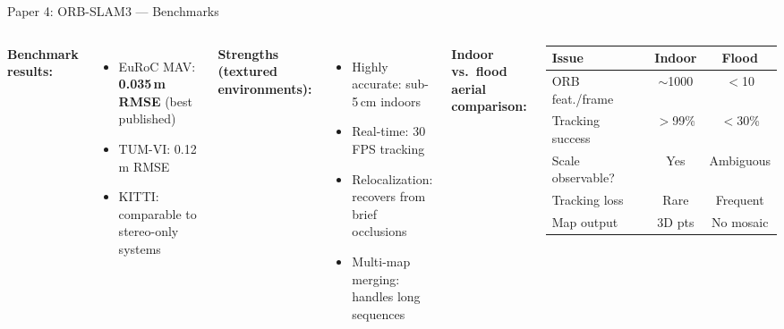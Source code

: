 \documentclass[aspectratio=169, 11pt]{beamer}
\begin{document}
\begin{frame}{Paper 4: ORB-SLAM3 --- Benchmarks}
\small
\begin{columns}[T]
\textbf{Benchmark results:}
\begin{itemize}
    \item EuRoC MAV: \textbf{0.035\,m RMSE} (best published)
    \item TUM-VI: 0.12\,m RMSE
    \item KITTI: comparable to stereo-only systems
\end{itemize}

\vspace{0.3em}
\textbf{Strengths (textured environments):}
\begin{itemize}
    \item Highly accurate: sub-5\,cm indoors
    \item Real-time: 30 FPS tracking
    \item Relocalization: recovers from brief occlusions
    \item Multi-map merging: handles long sequences
\end{itemize}

\textbf{Indoor vs.\ flood aerial comparison:}
\begin{table}
\centering
\renewcommand{\arraystretch}{1.15}
\begin{tabular}{lcc}
\toprule
\textbf{Issue} & \textbf{Indoor} & \textbf{Flood} \\
\midrule
ORB feat./frame & $\sim$1000 & $<$10 \\
Tracking success & $>$99\% & $<$30\% \\
Scale observable? & Yes & Ambiguous \\
Tracking loss & Rare & Frequent \\
Map output & 3D pts & No mosaic \\
\bottomrule
\end{tabular}
\end{table}
\end{columns}
\end{frame}
\end{document}
